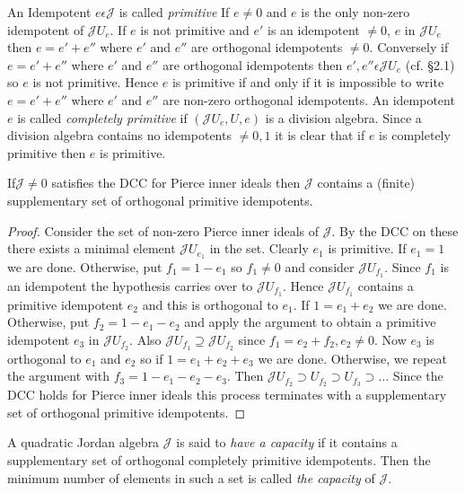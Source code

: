 An Idempotent $e\epsilon \mathscr{J}$ is called {\em primitive} If
$e\neq 0$ and $e$ is the only non-zero idempotent of
$\mathscr{J}U_e$. If $e$ is  not primitive and $e'$ is an idempotent
$\neq 0$, $e$ in $\mathscr{J}U_e$ then $e=e'+e''$ where $e'$ and $e''$
are orthogonal idempotents $\neq 0$. Conversely if $e=e'+e''$ where
$e'$ and $e''$ are orthogonal idempotents then $e',e''\epsilon
\mathscr{J} U_e$ (cf. \S 2.1) so $e$ is not primitive. Hence $e$ is
primitive if and only if it is impossible to write $e=e'+e''$ where
$e'$ and $e''$ are non-zero orthogonal idempotents. An idempotent $e$
is called {\em completely primitive} if $(\mathscr{J}U_e,U,e)$ is a
division algebra. Since a division algebra contains no idempotents
$\neq 0,1$ it is clear that if $e$ is completely primitive then $e$ is
primitive.

\setcounter{lemma}{0}
\begin{lemma}\label{c3:sec6:lem1}
If\pageoriginale $\mathscr{J}\neq 0$ satisfies the DCC for Pierce
inner ideals then $\mathscr{J}$ contains a (finite) supplementary set
of orthogonal primitive idempotents.
\end{lemma}

\begin{proof}
Consider the set of non-zero Pierce inner ideals of $\mathscr{J}$. By
the DCC on these there exists a minimal element $\mathscr{J}U_{e_{1}}$
in the set. Clearly $e_1$ is primitive. If $e_1=1$ we are
done. Otherwise, put $f_1=1-e_1$ so $f_1\neq0$ and consider
$\mathscr{J}U_{f_{1}}$. Since $f_1$ is an idempotent the hypothesis
carries over to 
$\mathscr{J}U_{f_1}$. Hence $\mathscr{J}U_{f_1}$ contains a primitive
idempotent $e_2$ and this is orthogonal to $e_1$. If $1=e_1+e_2$ we
are done. Otherwise, put $f_2=1 -e_1-e_2$ and apply the argument to
obtain a primitive idempotent $e_3$ in $\mathscr{J}U_{f_2}$. Also
$\mathscr{J}U_{f_1}\supseteq \mathscr{J}U_{f_2}$ since $f_1=e_2+f_2,
e_2\neq 0$. Now $e_3$ is orthogonal to $e_1$ and $e_2$ so if
$1=e_1+e_2+e_3$ we are done. Otherwise, we repeat the argument with
$f_3=1-e_1-e_2-e_3$. Then $\mathscr{J} U_{f_{2}}\supset
U_{f_2}\supset U_{f_3}\supset\ldots$ Since the DCC holds for Pierce
inner ideals this process terminates with a supplementary set of
orthogonal primitive idempotents.
\end{proof}

\begin{defn}\label{c3:defn4}
A quadratic Jordan algebra $\mathscr{J}$ is said to {\em have a
  capacity} if it contains a supplementary set of orthogonal
completely primitive idempotents. Then the minimum number of elements
in such a set is called {\em the capacity} of $\mathscr{J}$.
\end{defn}

